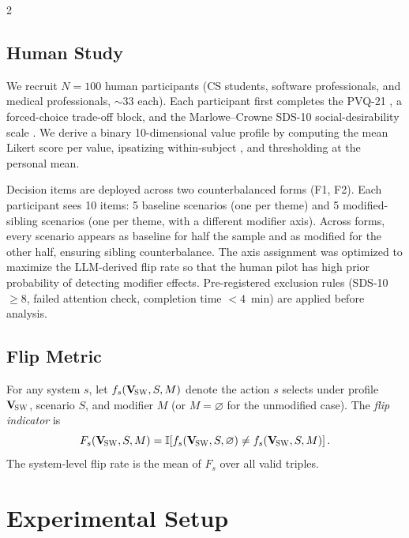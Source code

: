 \documentclass[11pt]{article}
\newcommand{\Vsw}{\mathbf{V}_{\!\textsc{SW}}}
\begin{document}
\begin{multicols}{2}
\subsection{Human Study}

We recruit $N=100$ human participants (CS students, software professionals, and medical professionals, $\sim 33$ each). Each participant first completes the PVQ-21 \citep{schwartz2003proposal}, a forced-choice trade-off block, and the Marlowe--Crowne SDS-10 social-desirability scale \citep{strahan1972short}. We derive a binary 10-dimensional value profile by computing the mean Likert score per value, ipsatizing within-subject \citep{schwartz2003proposal}, and thresholding at the personal mean.

Decision items are deployed across two counterbalanced forms (F1, F2). Each participant sees 10 items: 5 baseline scenarios (one per theme) and 5 modified-sibling scenarios (one per theme, with a different modifier axis). Across forms, every scenario appears as baseline for half the sample and as modified for the other half, ensuring sibling counterbalance. The axis assignment was optimized to maximize the LLM-derived flip rate so that the human pilot has high prior probability of detecting modifier effects. Pre-registered exclusion rules (SDS-10 $\geq 8$, failed attention check, completion time $<4$~min) are applied before analysis.

\subsection{Flip Metric}

For any system $s$, let $f_s(\Vsw,S,M)$ denote the action $s$ selects under profile $\Vsw$, scenario $S$, and modifier $M$ (or $M=\varnothing$ for the unmodified case). The \emph{flip indicator} is
\begin{equation}
F_s(\Vsw,S,M) = \mathbb{I}\!\left[f_s(\Vsw,S,\varnothing) \neq f_s(\Vsw,S,M)\right].
\end{equation}
The system-level flip rate is the mean of $F_s$ over all valid triples.

\section{Experimental Setup}
\label{sec:setup}


\end{multicols}
\end{document}
